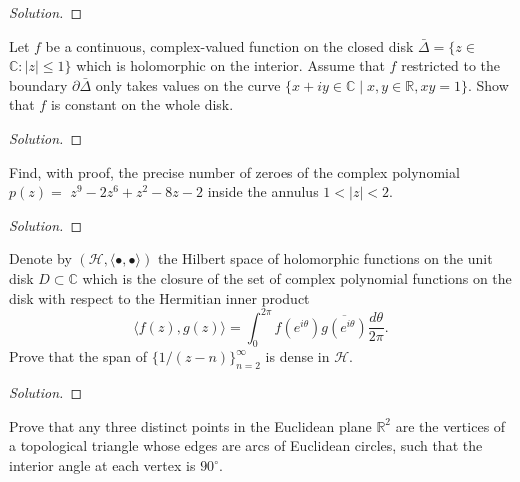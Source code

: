 \documentclass[10pt]{article}
\newenvironment{soln}{\begin{proof}[Solution]}{\end{proof}}
\begin{document}
\begin{soln}

\end{soln}



\begin{problem}
[2012 J-II-2]
Let $f$ be a continuous, complex-valued function on the closed disk $\bar{\Delta}=\{z \in$ $\mathbb{C}:|z| \leq 1\}$ which is holomorphic on the interior. Assume that $f$ restricted to the boundary $\partial \bar{\Delta}$ only takes values on the curve $\{x+i y \in \mathbb{C} \mid x, y \in \mathbb{R}, x y=1\}.$ Show that $f$ is constant on the whole disk.
\end{problem}

\begin{soln}

\end{soln}



\begin{problem}
[2012 A-I-4]
Find, with proof, the precise number of zeroes of the complex polynomial $p(z)=$ $z^9-2 z^6+z^2-8 z-2$ inside the annulus $1<|z|<2.$
\end{problem}

\begin{soln}

\end{soln}



\begin{problem}
[2012 A-II-6]
Denote by $(\mathcal{H},\langle\bullet, \bullet\rangle)$ the Hilbert space of holomorphic functions on the unit disk $D \subset \mathbb{C}$ which is the closure of the set of complex polynomial functions on the disk with respect to the Hermitian inner product
$$
\langle f(z), g(z)\rangle=\int_0^{2 \pi} f\left(e^{i \theta}\right) \overline{g\left(e^{i \theta}\right)} \frac{d \theta}{2 \pi} .
$$
Prove that the span of $\{1 /(z-n)\}_{n=2}^{\infty}$ is dense in $\mathcal{H}.$
\end{problem}

\begin{soln}

\end{soln}



\begin{problem}
[2011 J-I-1]
Prove that any three distinct points in the Euclidean plane $\mathbb{R}^2$ are the vertices of a topological triangle whose edges are arcs of Euclidean circles, such that the interior angle at each vertex is $90^{\circ}.$
\end{problem}
\end{document}
